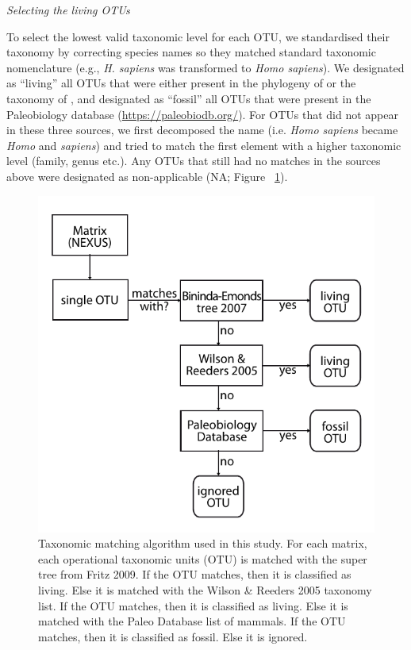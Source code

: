 \documentclass[12pt,letterpaper]{article}
\renewcommand{\subsection}[1]{%
\bigskip
\begin{center}
\begin{large}
\normalfont\itshape #1
\end{large}
\end{center}}
\begin{document}
\subsection{Selecting the living OTUs}
To select the lowest valid taxonomic level for each OTU, we standardised their taxonomy by correcting species names so they matched standard taxonomic nomenclature (e.g., \textit{H. sapiens} was transformed to \textit{Homo sapiens}).
We designated as ``living'' all OTUs that were either present in the phylogeny of \cite{bininda-emondsthe2007} or the taxonomy of \cite{wilson2005mammal}, and designated as ``fossil'' all OTUs that were present in the Paleobiology database (\url{https://paleobiodb.org/}).
For OTUs that did not appear in these three sources, we first decomposed the name (i.e. \textit{Homo sapiens} became \textit{Homo} and \textit{sapiens}) and tried to match the first element with a higher taxonomic level (family, genus etc.).
Any OTUs that still had no matches in the sources above were designated as non-applicable (NA; Figure ~\ref{Supp_figure_Taxonomic_algorithm}).

\begin{figure}[!htbp]
\centering
    \includegraphics[width=1\textwidth]{Supp_figure_Taxonomic_algorithm.pdf}
\caption{Taxonomic matching algorithm used in this study. For each matrix, each operational taxonomic units (OTU) is matched with the super tree from Fritz 2009. If the OTU matches, then it is classified as living. Else it is matched with the Wilson \& Reeders 2005 taxonomy list. If the OTU matches, then it is classified as living. Else it is matched with the Paleo Database list of mammals. If the OTU matches, then it is classified as fossil. Else it is ignored.}
\label{Supp_figure_Taxonomic_algorithm}
\end{figure}
\end{document}
